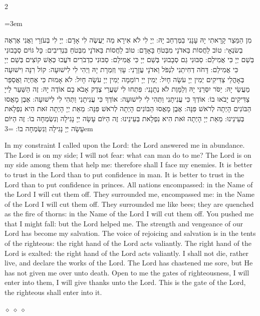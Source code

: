 \documentclass[11pt, openany]{book}
\newenvironment{bilingual}{%
  \par\vspace{4pt}%
  \begin{paracol}{2}%
}{%
  \end{paracol}%
  \par\vspace{2pt}%
}
\newenvironment{hebrewcol}{%
  \switchcolumn[1]%
  \begingroup
  \RTL
  \hebrewfont\large
  \setstretch{1.4}%
  \emergencystretch=3em
  \tolerance=9999
  \parindent=0pt\relax
}{%
  \endRTL
  \endgroup
}
\newenvironment{englishcol}{%
  \switchcolumn[0]%
  \begingroup
  \setstretch{1.4}%
  \emergencystretch=3em
  \tolerance=9999
  \normalsize
  \rightskip=0.12in\relax
}{%
  \endgroup
}
\newcommand{\parasep}{%
  \par\vspace{3pt}
  \begin{center}
    \textcolor{sedergold!50}{\tiny$\diamond\;\diamond\;\diamond$}
  \end{center}
  \par\vspace{3pt}
}
\begin{document}
\begin{bilingual}
\begin{hebrewcol}
מִן הַמֵּצַר קָרָאתִי יָהּ עָנָנִי בַמֶּרְחַב יָהּ: יְיָ לִי לֹא אִירָא מַה יַּעֲשֶׂה לִי אָדָם: יְיָ לִי בְּעֹזְרָי וַאֲנִי אֶרְאֶה בְשׂנְאָי: טוֹב לַחֲסוֹת בַּאדֹנָי מִבְּטֹחַ בָּאָדָם: טוֹב לַחֲסוֹת בַּאדֹנָי מִבְּטֹחַ בִּנְדִיבִים: כָּל גּוֹיִם סְבָבוּנִי בְּשֵׁם יְיָ כִּי אֲמִילַם: סַבּוּנִי גַם סְבָבוּנִי בְּשֵׁם יְיָ כִּי אֲמִילַם: סַבּוּנִי כִדְבֹרִים דֹּעֲכוּ כְּאֵשׁ קוֹצִים בְּשֵׁם יְיָ כִּי אֲמִילַם: דָּחֹה דְחִיתַנִי לִנְפֹּל וַאדֹנָי עֲזָרָנִי: עָזִּי וְזִמְרָת יָהּ וַיְהִי לִי לִישׁוּעָה: קוֹל רִנָּה וִישׁוּעָה בְּאָהֳלֵי צַדִּיקִים יְמִין יְיָ עֹשָׂה חָיִל: יְמִין יְיָ רוֹמֵמָה יְמִין יְיָ עֹשָׂה חָיִל: לֹא אָמוּת כִּי אֶחְיֶה וַאֲסַפֵּר מַעֲשֵׂי יָהּ: יַסֹּר יִסְּרַנִּי יָהּ וְלַמָּוֶת לֹא נְתָנָנִי: פִּתְחוּ לִי שַׁעֲרֵי צֶדֶק אָבֹא בָם אוֹדֶה יָהּ: זֶה הַשַּׁעַר לַייָ צַדִּיקִים יָבֹאוּ בוֹ: אוֹדְךָ כִּי עֲנִיתָנִי וַתְּהִי לִי לִישׁוּעָה: אוֹדְךָ כִּי עֲנִיתָנִי וַתְּהִי לִי לִישׁוּעָה: אֶבֶן מָאֲסוּ הַבּוֹנִים הָיְתָה לְרֹאשׁ פִּנָּה: אֶבֶן מָאֲסוּ הַבּוֹנִים הָיְתָה לְרֹאשׁ פִּנָּה: מֵאֵת יְיָ הָיְתָה זֹּאת הִיא נִפְלָאת בְּעֵינֵינוּ: מֵאֵת יְיָ הָיְתָה זֹּאת הִיא נִפְלָאת בְּעֵינֵינוּ: זֶה הַיּוֹם עָשָׂה יְיָ נָגִילָה וְנִשְׂמְחָה בוֹ: זֶה הַיּוֹם עָשָׂה יְיָ נָגִילָה וְנִשְׂמְחָה בוֹ:
\end{hebrewcol}
\begin{englishcol}
In my constraint I called upon the Lord: the Lord answered me in abundance. The Lord is on my side; I will not fear: what can man do to me? The Lord is on my side among them that help me: therefore shall I face my enemies. It is better to trust in the Lord than to put confidence in man. It is better to trust in the Lord than to put confidence in princes. All nations encompassed: in the Name of the Lord I will cut them off. They surrounded me, encompassed me: in the Name of the Lord I will cut them off. They surrounded me like bees; they are quenched as the fire of thorns: in the Name of the Lord I will cut them off. You pushed me that I might fall: but the Lord helped me. The strength and vengeance of our Lord has become my salvation. The voice of rejoicing and salvation is in the tents of the righteous: the right hand of the Lord acts valiantly. The right hand of the Lord is exalted: the right hand of the Lord acts valiantly. I shall not die, rather live, and declare the works of the Lord. The Lord has chastened me sore, but He has not given me over unto death. Open to me the gates of righteousness, I will enter into them, I will give thanks unto the Lord. This is the gate of the Lord, the righteous shall enter into it.
\end{englishcol}
\end{bilingual}
\parasep
\end{document}
